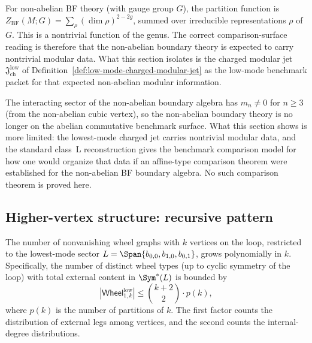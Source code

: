 \begin{remark}
For non-abelian BF theory (with gauge group $G$), the partition function is
$Z_{\mathrm{BF}}(M; G) = \sum_\rho (\dim \rho)^{2-2g}$, summed over irreducible
representations $\rho$ of $G$. This is a nontrivial function of the genus. The
correct comparison-surface reading is therefore that the non-abelian boundary theory
is expected to carry nontrivial modular data. What this section isolates is
the charged modular jet $\mathfrak{J}^{\mathrm{low}}_{\mathrm{ch}}$ of
Definition~\ref{def:low-mode-charged-modular-jet} as the low-mode benchmark packet
for that expected non-abelian modular information.

The interacting sector of the non-abelian boundary algebra has $m_n \neq 0$ for
$n \geq 3$ (from the non-abelian cubic vertex), so the non-abelian boundary theory
is no longer on the abelian commutative benchmark surface. What this section shows is
more limited: the lowest-mode charged jet carries nontrivial modular data, and the
standard class~L reconstruction gives the benchmark comparison model for how one
would organize that data if an affine-type comparison theorem were established for
the non-abelian BF boundary algebra. No such comparison theorem is proved here.
\end{remark}

\subsection{Higher-vertex structure: recursive pattern}

\begin{proposition}
The number of nonvanishing wheel graphs with $k$ vertices on the loop, restricted
to the lowest-mode sector $L = \Span\{b_{0,0}, b_{1,0}, b_{0,1}\}$, grows polynomially
in $k$. Specifically, the number of distinct wheel types (up to cyclic symmetry of
the loop) with total external content in $\Sym^*(L)$ is bounded by
\begin{equation}
|\mathsf{Wheel}_{1,k}^{\mathrm{low}}| \leq
\binom{k + 2}{2} \cdot p(k),
\end{equation}
where $p(k)$ is the number of partitions of $k$. The first factor counts the
distribution of external legs among vertices, and the second counts the
internal-degree distributions.
\end{proposition}

